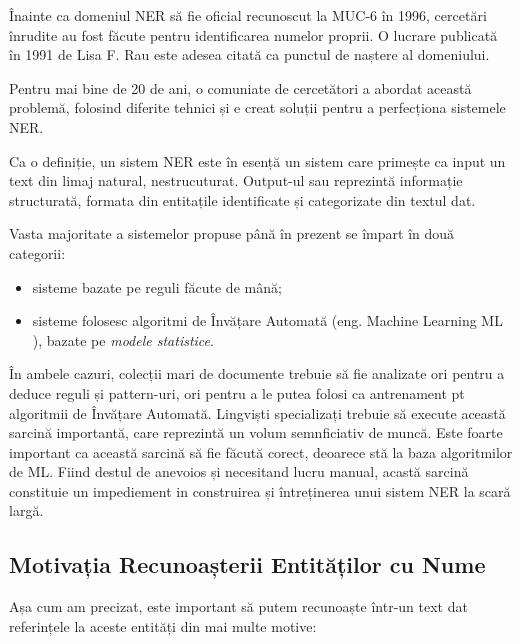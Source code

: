 Înainte ca domeniul NER să fie oficial recunoscut la MUC-6 în 1996, cercetări înrudite au fost făcute pentru identificarea numelor proprii. O lucrare publicată în 1991 de Lisa F. Rau este adesea citată ca punctul de naștere al domeniului.\cite{rau1991}

Pentru mai bine de 20 de ani, o comuniate de cercetători a abordat această problemă, folosind diferite tehnici și e creat soluții pentru a perfecționa sistemele NER.


Ca o definiție, un sistem NER este în esență un sistem care primește ca input un text din limaj natural, nestrucuturat. Output-ul sau reprezintă informație structurată, formata din entitațile identificate și categorizate din textul dat.


Vasta majoritate a sistemelor propuse până în prezent se împart în două categorii:

\begin{itemize}
\item sisteme bazate pe reguli făcute de mână;
\item sisteme folosesc algoritmi de Învățare Automată (eng. Machine Learning ML ), bazate pe \textit{modele statistice}.
\end{itemize}


În ambele cazuri, colecții mari de documente trebuie să fie analizate ori pentru a deduce reguli și pattern-uri, ori pentru a le putea folosi ca antrenament pt algoritmii de Învățare Automată. Lingviști specializați trebuie să execute această sarcină importantă, care reprezintă un volum semnficiativ de muncă. Este foarte important ca această sarcină să fie făcută corect, deoarece stă la baza algoritmilor de ML. Fiind destul de anevoios și necesitand lucru manual, acastă sarcină constituie un impediement in construirea și întreținerea unui sistem NER la scară largă.

\subsection{Motivația Recunoașterii Entităților cu Nume}

Așa cum am precizat, este important să putem recunoaște într-un text dat referințele la aceste entități din mai multe motive:

